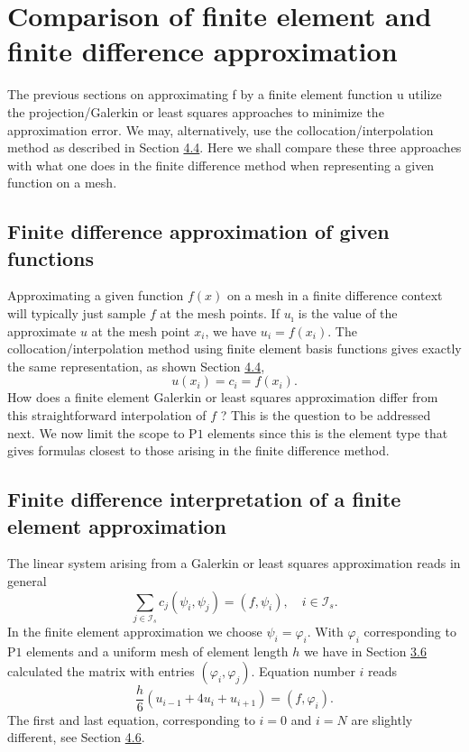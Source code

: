 \documentclass[../main.tex]{subfiles}
\begin{document}
	\chapter{Comparison of finite element and finite difference approximation}
	\label{chap:chap_5}
	\noindent The previous sections on approximating f by a finite element function u utilize
	the projection/Galerkin or least squares approaches to minimize the approximation error. We may, alternatively, use the collocation/interpolation method
	as described in Section \hyperref[sec:sec_4_4]{4.4}. Here we shall compare these three approaches with
	what one does in the finite difference method when representing a given function
	on a mesh.
	\section[Finite difference approximation of given functions]{Finite difference approximation of given functions}
	\label{sec:sec_5_1}
	Approximating a given function $f(x)$ on a mesh in a finite difference context will typically just sample $f$ at the mesh points. If $u_{\imath}$ is the value of the approximate $u$ at the mesh point $x_{i}$, we have $u_{i}=f\left(x_{i}\right)$. The collocation/interpolation method using finite element basis functions gives exactly the same representation, as shown Section \hyperref[sec:sec_4_4]{4.4},
	$$
	u\left(x_{i}\right)=c_{i}=f\left(x_{i}\right) .
	$$
	How does a finite element Galerkin or least squares approximation differ from this straightforward interpolation of $f$ ? This is the question to be addressed next. We now limit the scope to $\mathrm{P} 1$ elements since this is the element type that gives formulas closest to those arising in the finite difference method.
	\section[Finite difference interpretation of a finite element approximation]{Finite difference interpretation of a finite element approximation}
	\label{sec:sec_5_2}
	The linear system arising from a Galerkin or least squares approximation reads in general
	$$
	\sum_{j \in \mathcal{I}_{s}} c_{j}\left(\psi_{i}, \psi_{j}\right)=\left(f, \psi_{i}\right), \quad i \in \mathcal{I}_{s}.
	$$
	In the finite element approximation we choose $\psi_{i}=\varphi_{i}$. With $\varphi_{i}$ corresponding to $\mathrm{P} 1$ elements and a uniform mesh of element length $h$ we have in Section \hyperref[sec:sec_3_6]{3.6} calculated the matrix with entries $\left(\varphi_{i}, \varphi_{j}\right)$. Equation number $i$ reads
	\begin{equation}\label{eqa84}
		\frac{h}{6}\left(u_{i-1}+4 u_{i}+u_{i+1}\right)=\left(f, \varphi_{i}\right).
	\end{equation}
	The first and last equation, corresponding to $i=0$ and $i=N$ are slightly different, see Section \hyperref[sec:sec_4_6]{4.6}.
	
\end{document}

